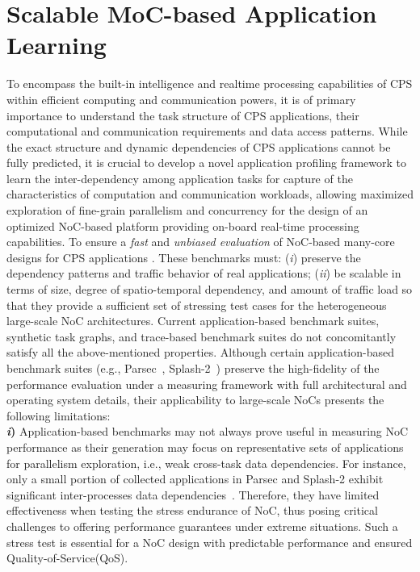 \chapter{Scalable MoC-based Application Learning}
\label{cha:ch5}
To encompass the built-in intelligence and realtime processing capabilities of CPS within efficient computing and communication powers, it is of primary importance to understand the task structure of CPS applications, their computational and communication requirements and data access patterns.  While the exact structure and dynamic dependencies of CPS applications cannot be fully predicted, it is crucial to develop a novel application profiling framework to learn the inter-dependency among application tasks for capture of the characteristics of computation and communication workloads, allowing maximized exploration of fine-grain parallelism and concurrency for the design of an optimized NoC-based platform providing on-board real-time processing capabilities. To ensure a \textit{fast} and \textit{unbiased evaluation} of NoC-based many-core designs for CPS applications . These benchmarks must: (\textit{i}) preserve the dependency patterns and traffic behavior of real applications; (\textit{ii}) be scalable in terms of size, degree of spatio-temporal dependency, and amount of traffic load so that they provide a sufficient set of stressing test cases for the heterogeneous large-scale NoC architectures. Current application-based benchmark suites, synthetic task graphs, and trace-based benchmark suites do not concomitantly satisfy all the above-mentioned properties. Although certain application-based benchmark suites (e.g., Parsec~\cite{bienia08characterizationreport}, Splash-2~\cite{woo1995splash}) preserve the high-fidelity of the performance evaluation under a measuring framework with full architectural and operating system details, their applicability to large-scale NoCs presents the following limitations:\\
\noindent \textbf{\textit{i})} Application-based benchmarks may not always prove useful in measuring NoC performance as their generation may focus on representative sets of applications for parallelism exploration, i.e., weak cross-task data dependencies. For instance, only a small portion of collected applications in Parsec and Splash-2 exhibit significant inter-processes data dependencies~\cite{barrow2009communication}. Therefore, they have limited effectiveness when testing the stress endurance of NoC, thus posing critical challenges to offering performance guarantees under extreme situations. Such a stress test is essential for a NoC design with predictable performance and ensured Quality-of-Service(QoS).\\
